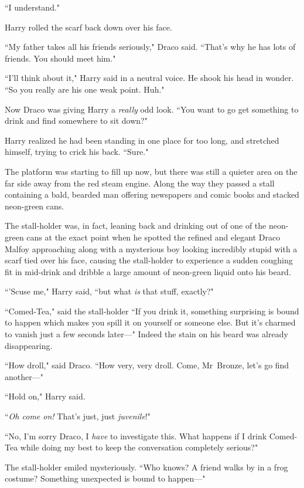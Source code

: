``I understand."

Harry rolled the scarf back down over his face.

``My father takes all his friends seriously," Draco said. ``That's why he has lots of friends. You should meet him."

``I'll think about it," Harry said in a neutral voice. He shook his head in wonder. ``So you really are his one weak point. Huh."

Now Draco was giving Harry a \emph{really} odd look. ``You want to go get something to drink and find somewhere to sit down?"

Harry realized he had been standing in one place for too long, and stretched himself, trying to crick his back. ``Sure."

The platform was starting to fill up now, but there was still a quieter area on the far side away from the red steam engine. Along the way they passed a stall containing a bald, bearded man offering newspapers and comic books and stacked neon-green cans.

The stall-holder was, in fact, leaning back and drinking out of one of the neon-green cans at the exact point when he spotted the refined and elegant Draco Malfoy approaching along with a mysterious boy looking incredibly stupid with a scarf tied over his face, causing the stall-holder to experience a sudden coughing fit in mid-drink and dribble a large amount of neon-green liquid onto his beard.

``'Scuse me," Harry said, ``but what \emph{is} that stuff, exactly?"

``Comed-Tea," said the stall-holder ``If you drink it, something surprising is bound to happen which makes you spill it on yourself or someone else. But it's charmed to vanish just a few seconds later—" Indeed the stain on his beard was already disappearing.

``How droll," said Draco. ``How very, very droll. Come, Mr~Bronze, let's go find another—"

``Hold on," Harry said.

``\emph{Oh come on!} That's just, just \emph{juvenile}!"

``No, I'm sorry Draco, I \emph{have} to investigate this. What happens if I drink Comed-Tea while doing my best to keep the conversation completely serious?"

The stall-holder smiled mysteriously. ``Who knows? A friend walks by in a frog costume? Something unexpected is bound to happen—"


